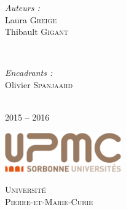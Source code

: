 \documentclass[12pt]{article}
\begin{document}
\begin{titlepage}

\begin{minipage}{0.4\textwidth}
\begin{flushleft} \large
\emph{Auteurs :}\\
Laura \textsc{Greige}\\ %
Thibault \textsc{Gigant}\\ %
\end{flushleft}
\end{minipage}
~
\begin{minipage}{0.4\textwidth}
\begin{flushright} \large
\emph{Encadrants :} \\
Olivier \textsc{Spanjaard}\\ %
\end{flushright}
\end{minipage}\\[2cm]


\vspace{3cm}
{\large 2015 -- 2016}\\[2cm] %


\vfill
\begin{center}
\includegraphics[width=5cm]{upmc-logotype.png}

\medskip
\textsc{\large Universit\'{e}\\ Pierre-et-Marie-Curie}%
\end{center}
 

\vfill %

\end{titlepage}
\end{document}
